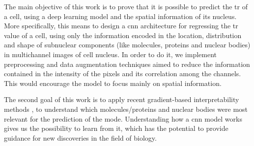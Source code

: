 
\glsresetall

The main objective of this work is to prove that it is possible to predict the \gls{tr} of a cell, using a deep learning model and the spatial information of its nucleus. More specifically, this means to design a \gls{cnn} architecture for regressing the \gls{tr} value of a cell, using only the information encoded in the location, distribution and shape of subnuclear components (like molecules, proteins and nuclear bodies) in multichannel images of cell nucleus.
In order to do it, we implement preprocessing and data augmentation techniques aimed to reduce the information contained in the intensity of the pixels and its correlation among the channels. This would encourage the model to focus mainly on spatial information.

The second goal of this work is to apply recent gradient-based interpretability methods \cite{adebayo2020sanity}, to understand which molecules/proteins and nuclear bodies were most relevant for the prediction of the mode.
Understanding how a \gls{cnn} model works gives us the possibility to learn from it, which has the potential to provide guidance for new discoveries in the field of biology.

